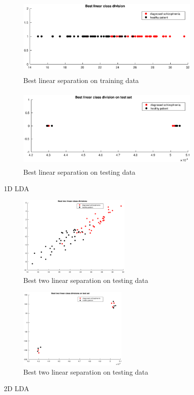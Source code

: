 \documentclass{article}
\begin{document}
\begin{figure}[H]
    \begin{subfigure}{0.5\textwidth}
        \includegraphics[width=0.9\linewidth, height=4cm]{Figures/LDA1D.eps} 
        \caption{Best linear separation on training data}
    \end{subfigure}
    \begin{subfigure}{0.5\textwidth}
        \includegraphics[width=0.9\linewidth, height=4cm]{Figures/LDA1DTest.eps}
        \caption{Best linear separation on testing data}
    \end{subfigure}
 
    \caption{1D LDA}
\end{figure}
\begin{figure}[H]
    \begin{subfigure}{0.5\textwidth}
        \includegraphics[width=0.9\linewidth, height=4cm]{Figures/LDA2D.eps} 
        \caption{Best two linear separation on testing data}
    \end{subfigure}
    \begin{subfigure}{0.5\textwidth}
        \includegraphics[width=0.9\linewidth, height=4cm]{Figures/LDA2DTest.eps}
        \caption{Best two linear separation on testing data}
    \end{subfigure}
 
    \caption{2D LDA}
\end{figure}
\end{document}

